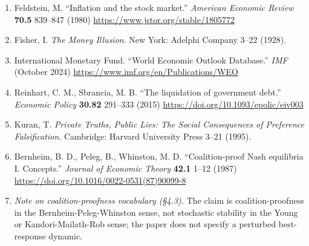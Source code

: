 \documentclass[12pt]{article}
\theoremstyle{definition}
\theoremstyle{remark}
\begin{document}
\begin{enumerate}[leftmargin=*,labelsep=0.5em,label=\arabic*.]
\item Feldstein, M. ``Inflation and the stock market.''
\emph{American Economic Review} \textbf{70.5} 839--847 (1980)
\url{https://www.jstor.org/stable/1805772}

\item Fisher, I. \emph{The Money Illusion}. New York: Adelphi
Company 3--22 (1928).

\item International Monetary Fund. ``World Economic Outlook
Database.'' \emph{IMF} (October 2024)
\url{https://www.imf.org/en/Publications/WEO}

\item Reinhart, C. M., Sbrancia, M. B. ``The liquidation of
government debt.'' \emph{Economic Policy} \textbf{30.82}
291--333 (2015) \url{https://doi.org/10.1093/epolic/eiv003}

\item Kuran, T. \emph{Private Truths, Public Lies: The Social
Consequences of Preference Falsification}. Cambridge: Harvard
University Press 3--21 (1995).

\item Bernheim, B. D., Peleg, B., Whinston, M. D.
``Coalition-proof Nash equilibria I. Concepts.'' \emph{Journal of
Economic Theory} \textbf{42.1} 1--12 (1987)
\url{https://doi.org/10.1016/0022-0531(87)90099-8}

\item \emph{Note on coalition-proofness vocabulary (\S4.3).} The claim is coalition-proofness in the Bernheim-Peleg-Whinston sense, not stochastic stability in the Young or Kandori-Mailath-Rob sense; the paper does not specify a perturbed best-response dynamic.

\end{enumerate}
\end{document}
